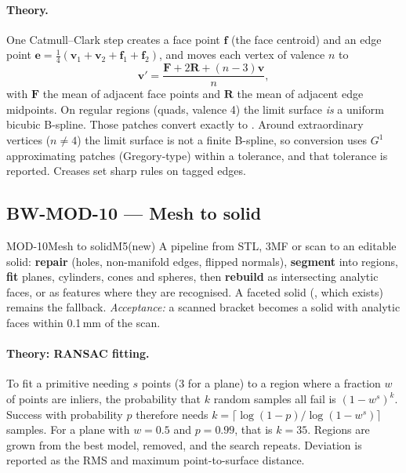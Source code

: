 \paragraph{Theory.} One Catmull--Clark step creates a face point $\mathbf f$ (the face centroid) and an edge
point $\mathbf e=\tfrac14(\mathbf v_1+\mathbf v_2+\mathbf f_1+\mathbf f_2)$, and moves each vertex of
valence $n$ to
\[
  \mathbf v'=\frac{\mathbf F+2\mathbf R+(n-3)\mathbf v}{n},
\]
with $\mathbf F$ the mean of adjacent face points and $\mathbf R$ the mean of adjacent edge midpoints. On
regular regions (quads, valence 4) the limit surface \emph{is} a uniform bicubic B-spline. Those patches
convert exactly to . Around extraordinary vertices ($n\neq4$) the limit surface
is not a finite B-spline, so conversion uses $G^1$ approximating patches (Gregory-type) within a tolerance,
and that tolerance is reported. Creases set sharp rules on tagged edges.

\subsection{BW-MOD-10 --- Mesh to solid}

\begin{epic}{MOD-10}{Mesh to solid}{M5}{\stTodo}{(new)}
A pipeline from STL, 3MF or scan to an editable solid: \textbf{repair} (holes, non-manifold edges, flipped
normals), \textbf{segment} into regions, \textbf{fit} planes, cylinders, cones and spheres, then
\textbf{rebuild} as intersecting analytic faces, or as features where they are recognised. A faceted solid
(, which exists) remains the fallback.
\emph{Acceptance:} a scanned bracket becomes a solid with analytic faces within 0.1\,mm of the scan.
\end{epic}

\paragraph{Theory: RANSAC fitting.} To fit a primitive needing $s$ points (3 for a plane) to a region
where a fraction $w$ of points are inliers, the probability that $k$ random samples all fail is
$(1-w^s)^k$. Success with probability $p$ therefore needs $k=\lceil\log(1-p)/\log(1-w^s)\rceil$ samples.
For a plane with $w=0.5$ and $p=0.99$, that is $k=35$. Regions are grown from the best model, removed, and
the search repeats. Deviation is reported as the RMS and maximum point-to-surface distance.

